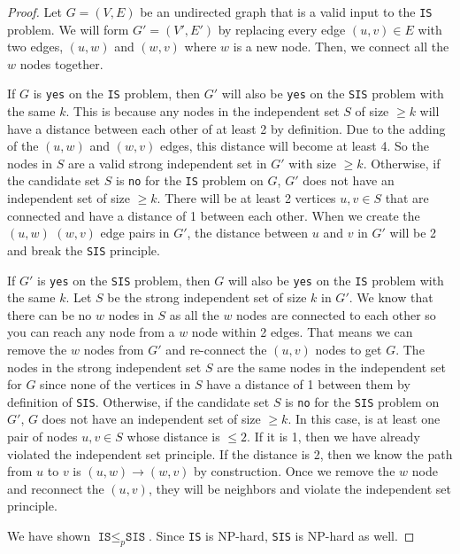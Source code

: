 \documentclass{article}
\begin{document}
\begin{proof}
    Let $G = (V, E)$ be an undirected graph that is a valid input to the \texttt{IS} problem.
    We will form $G' = (V', E')$ by replacing every edge $(u, v) \in E$ with two edges, $(u, w)$ and $(w, v)$ where $w$ is a new node.
    Then, we connect all the $w$ nodes together.

    If $G$ is \texttt{yes} on the \texttt{IS} problem, then $G'$ will also be \texttt{yes} on the \texttt{SIS} problem with the same $k$.
    This is because any nodes in the independent set $S$ of size $\geq k$ will have a distance between each other of at least 2 by definition. 
    Due to the adding of the $(u, w)$ and $(w, v)$ edges, this distance will become at least 4. So the nodes in $S$ are a valid strong independent set in $G'$ with size $\geq k$.
    Otherwise, if the candidate set $S$ is \texttt{no} for the \texttt{IS} problem on $G$, $G'$ does not have an independent set of size $\geq k$.
    There will be at least 2 vertices $u,v \in S$ that are connected and have a distance of 1 between each other. When we create the $(u, w)$ $(w, v)$ edge pairs in $G'$, the distance between $u$ and $v$ in $G'$ will be 2 and break the \texttt{SIS} principle.

    If $G'$ is \texttt{yes} on the \texttt{SIS} problem, then $G$ will also be \texttt{yes} on the \texttt{IS} problem with the same $k$.
    Let $S$ be the strong independent set of size $k$ in $G'$. 
    We know that there can be no $w$ nodes in $S$ as all the $w$ nodes are connected to each other so you can reach any node from a $w$ node within 2 edges.
    That means we can remove the $w$ nodes from $G'$ and re-connect the $(u, v)$ nodes to get $G$. The nodes in the strong independent set $S$ are the same nodes in the independent set for $G$ since none of the vertices in $S$ have a distance of 1 between them by definition of \texttt{SIS}.
    Otherwise, if the candidate set $S$ is \texttt{no} for the \texttt{SIS} problem on $G'$, $G$ does not have an independent set of size $\geq k$. 
    In this case, is at least one pair of nodes $u, v \in S$ whose distance is $\leq 2$. If it is 1, then we have already violated the independent set principle.
    If the distance is 2, then we know the path from $u$ to $v$ is $(u, w) \rightarrow (w, v)$ by construction. Once we remove the $w$ node and reconnect the $(u, v)$, they will be neighbors and violate the independent set principle.

    We have shown $\texttt{IS} \leq_p \texttt{SIS}$. Since \texttt{IS} is NP-hard, \texttt{SIS} is NP-hard as well.
\end{proof}
\end{document}
